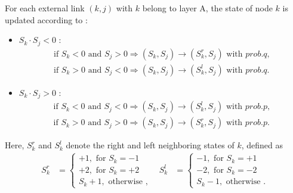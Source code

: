 \documentclass[review]{elsarticle}
\begin{document}
For each external link $(k,j)$ with $k$ belong to layer A, the state of node $k$ is updated according to :
\begin{itemize}
	\item $S_k \cdot S_j < 0$ :
	\begin{align}
	\mbox{if } S_k<0 \mbox{ and } S_j>0  \Rightarrow (S_k, S_j) \rightarrow (S_k^r, S_j) \mbox{ with } prob.q,\\
	\mbox{if } S_k>0 \mbox{ and } S_j<0  \Rightarrow (S_k, S_j) \rightarrow (S_k^l, S_j) \mbox{ with } prob.q.
	\end{align}
	\item $S_k \cdot S_j > 0$ :
	\begin{align}
	\mbox{if } S_k<0 \mbox{ and } S_j<0  \Rightarrow (S_k, S_j) \rightarrow (S_k^l, S_j) \mbox{ with } prob.p,\\
	\mbox{if } S_k>0 \mbox{ and } S_j>0  \Rightarrow (S_k, S_j) \rightarrow (S_k^r, S_j) \mbox{ with } prob.p.
	\end{align}
\end{itemize}
Here, $S_k^r$ and $S_k^l$ denote the right and left neighboring states of $k$, defined as
\begin{align}
S_k^r &= \left\{\begin{matrix}
+1,\mbox{ for } S_k = -1\\
+2,\mbox{ for } S_k = +2\\ 
S_k + 1,\mbox{ otherwise }, 
\end{matrix}\right. &
S_k^l &= \left\{\begin{matrix}
-1,\mbox{ for } S_k= +1
\\ -2,\mbox{ for } S_k=-2
\\ S_k - 1,\mbox{ otherwise }.
\end{matrix}\right.
\end{align}
\end{document}
